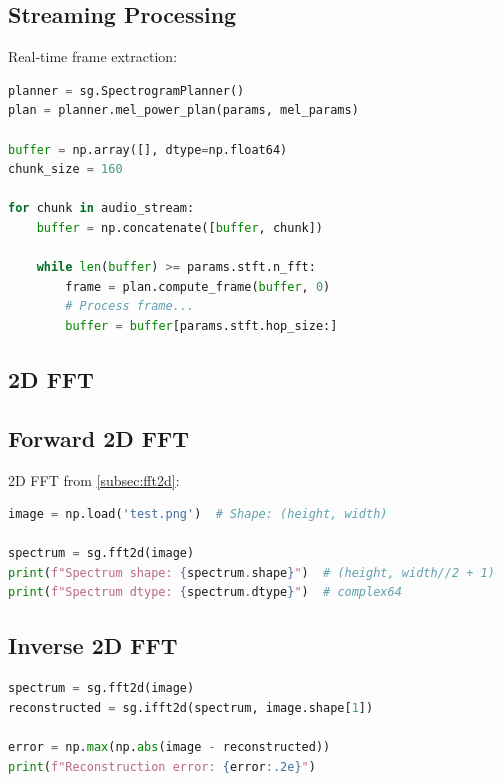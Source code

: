 \subsection*{Streaming Processing}

Real-time frame extraction:

\begin{lstlisting}[language=Python, caption={Streaming real-time frame extraction from buffer}]
planner = sg.SpectrogramPlanner()
plan = planner.mel_power_plan(params, mel_params)

buffer = np.array([], dtype=np.float64)
chunk_size = 160

for chunk in audio_stream:
    buffer = np.concatenate([buffer, chunk])

    while len(buffer) >= params.stft.n_fft:
        frame = plan.compute_frame(buffer, 0)
        # Process frame...
        buffer = buffer[params.stft.hop_size:]
\end{lstlisting}

\subsection*{2D FFT}

\subsection*{Forward 2D FFT}

2D FFT from \cref{subsec:fft2d}:

\begin{lstlisting}[language=Python, caption={Forward 2D FFT with half-spectrum output}]
image = np.load('test.png')  # Shape: (height, width)

spectrum = sg.fft2d(image)
print(f"Spectrum shape: {spectrum.shape}")  # (height, width//2 + 1)
print(f"Spectrum dtype: {spectrum.dtype}")  # complex64
\end{lstlisting}

\subsection*{Inverse 2D FFT}

\begin{lstlisting}[language=Python, caption={Inverse 2D FFT and reconstruction error}]
spectrum = sg.fft2d(image)
reconstructed = sg.ifft2d(spectrum, image.shape[1])

error = np.max(np.abs(image - reconstructed))
print(f"Reconstruction error: {error:.2e}")
\end{lstlisting}

